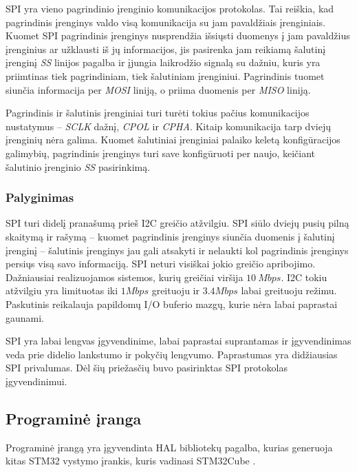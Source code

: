 SPI yra vieno pagrindinio įrenginio komunikacijos protokolas.
Tai reiškia, kad pagrindinis įrenginys valdo visą komunikacija su jam pavaldžiais įrenginiais.
Kuomet SPI pagrindinis įrenginys nusprendžia išsiųsti duomenys į jam pavaldžius įrenginius ar užklausti iš jų informacijos, jis pasirenka jam reikiamą šalutinį įrenginį \textit{SS} linijos pagalba ir įjungia laikrodžio signalą su dažniu, kuris yra priimtinas tiek pagrindiniam, tiek šalutiniam įrenginiui.
Pagrindinis tuomet siunčia informacija per \textit{MOSI} liniją, o priima duomenis per \textit{MISO} liniją.

Pagrindinis ir šalutinis įrenginiai turi turėti tokius pačius komunikacijos nustatymus -- \textit{SCLK} dažnį, \textit{CPOL} ir \textit{CPHA}.
Kitaip komunikacija tarp dviejų įrenginių nėra galima.
Kuomet šalutiniai įrenginiai palaiko keletą konfigūracijos galimybių, pagrindinis įrenginys turi save konfigūruoti per naujo, keičiant šalutinio įrenginio \textit{SS} pasirinkimą.

\subsubsection{Palyginimas}

SPI turi didelį pranašumą prieš I2C greičio atžvilgiu. SPI siūlo dviejų pusių pilną skaitymą ir rašymą -- kuomet pagrindinis įrenginys siunčia duomenis į šalutinį įrenginį -- šalutinis įrenginys jau gali atsakyti ir nelaukti kol pagrindinis įrenginys persiųs visą savo informaciją.
SPI neturi visiškai jokio greičio apribojimo.
Dažniausiai realizuojamos sistemos, kurių greičiai viršija $10~Mbps$.
I2C tokiu atžvilgiu yra limituotas iki $1Mbps$ greituoju ir $3.4Mbps$ labai greituoju režimu.
Paskutinis reikalauja papildomų I/O buferio mazgų, kurie nėra labai paprastai gaunami.

SPI yra labai lengvas įgyvendinime, labai paprastai suprantamas ir įgyvendinimas veda prie didelio lankstumo ir pokyčių lengvumo.
Paprastumas yra didžiausias SPI privalumas. 
Dėl šių priežasčių buvo pasirinktas SPI protokolas įgyvendinimui.

\subsection{Programinė įranga}

Programinė įrangą yra įgyvendinta HAL bibliotekų pagalba, kurias generuoja kitas STM32 vystymo įrankis, kuris vadinasi STM32Cube \cite{STM3293:online}.

